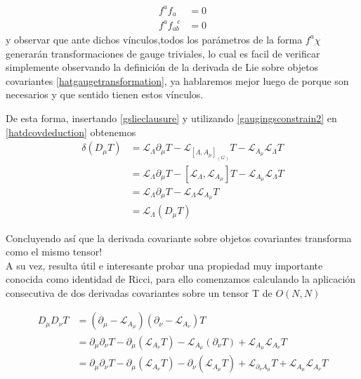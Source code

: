 \documentclass{article}
\numberwithin{equation}{section}
\begin{document}
\begin{equation}\label{gaugingsconstrain2}
\begin{aligned}
f^{a}f_{a}&=0\\ 
f^{a}f_{ab}^{\ \ \ c} &= 0 
\end{aligned}
\end{equation}
y observar que ante dichos vínculos,todos los parámetros de la forma
$f^{a}\chi$ generarán transformaciones de gauge triviales, lo cual
es facil de verificar simplemente observando la definición de la derivada
de Lie sobre objetos covariantes \ref{hatgaugetransformation}, ya
hablaremos mejor luego de porque son necesarios y que sentido tienen
estos vínculos.

De esta forma, insertando \ref{gslieclausure} y utilizando \ref{gaugingsconstrain2}
en \ref{hatdcovdeduction} obtenemos
\begin{align*}
\delta\left(D_{\mu}T\right) & =\mathcal{L}_{\Lambda}\partial_{\mu}T-\mathcal{L}_{\left[\Lambda,A_{\mu}\right]_{(G)}}T-\mathcal{L}_{A_{\mu}}\mathcal{L}_{\Lambda}T\\
& =\mathcal{L}_{\Lambda}\partial_{\mu}T-\left[\mathcal{L}_{\Lambda},\mathcal{L}_{A_{\mu}}\right]T-\mathcal{L}_{A_{\mu}}\mathcal{L}_{\Lambda}T\\
& =\mathcal{L}_{\Lambda}\partial_{\mu}T-\mathcal{L}_{\Lambda}\mathcal{L}_{A_{\mu}}T\\
& =\mathcal{L}_{\Lambda}\left(D_{\mu}T\right)
\end{align*}


Concluyendo así que la derivada covariante sobre objetos covariantes
transforma como el mismo tensor!\\

A su vez, resulta útil e interesante probar una propiedad muy importante
conocida como identidad de Ricci, para ello comenzamos calculando
la aplicación consecutiva de dos derivadas covariantes sobre un tensor
T de $O(N,N)$ 

\begin{align*}
D_{\mu}D_{\nu}T & =\left(\partial_{\mu}-\mathcal{L}_{A_{\mu}}\right)\left(\partial_{\nu}-\mathcal{L}_{A_{\nu}}\right)T\\
& =\partial_{\mu}\partial_{\nu}T-\partial_{\mu}\left(\mathcal{L}_{A_{\nu}}T\right)-\mathcal{L}_{A_{\mu}}\left(\partial_{\nu}T\right)+\mathcal{L}_{A_{\mu}}\mathcal{L}_{A_{\nu}}T\\
& =\partial_{\mu}\partial_{\nu}T-\partial_{\mu}\left(\mathcal{L}_{A_{\nu}}T\right)-\partial_{\nu}\left(\mathcal{L}_{A_{\mu}}T\right)+\mathcal{L}_{\partial_{\nu}A_{\mu}}T+\mathcal{L}_{A_{\mu}}\mathcal{L}_{A_{\nu}}T
\end{align*}
\end{document}
